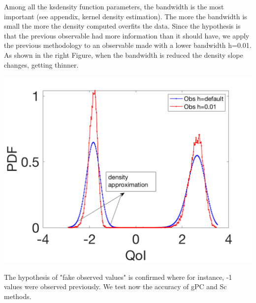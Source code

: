 \documentclass[11pt, a4paper, English]{report}
\begin{document}
\begin{minipage}{0.5\textwidth}
Among all the ksdensity function parameters, the bandwidth is the most important (see appendix, kernel density estimation). The more the bandwidth is small the more the density computed overfits the data. Since the hypothesis is that the previous observable had more information than it should have, we apply the previous methodology to an observable made with a lower bandwidth h=0.01. As shown in the right Figure, when the bandwidth is reduced the density slope changes, getting thinner.
\end{minipage}
\begin{minipage}{0.5\textwidth}
\includegraphics[width=\textwidth]{Obs_bandwidth.png}
\end{minipage}
The hypothesis of "fake observed values" is confirmed where for instance, -1 values were observed previously. We test now the accuracy of gPC and Sc methods.
\end{document}
